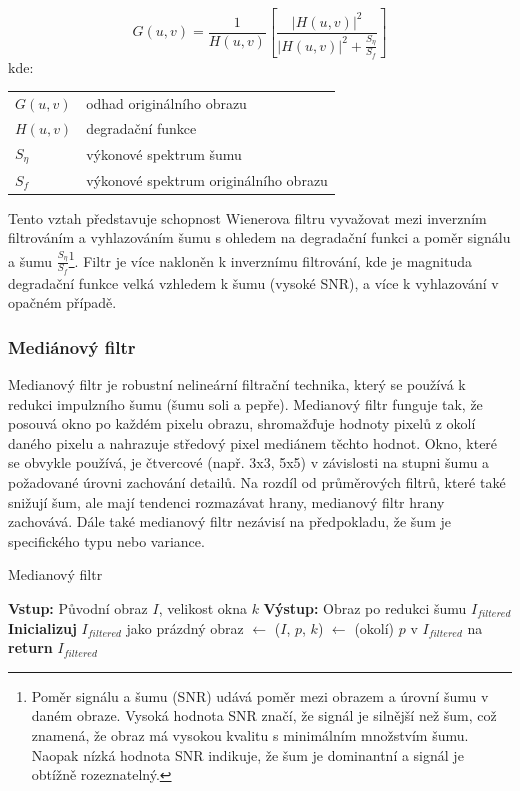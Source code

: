 \documentclass[male,czech,api_ing]{thesis}
\makeatletter
\newenvironment{conditions}[1][kde:]
    {#1 \begin{tabular}[t]{>{$}l<{$} @{${}={}$} >{\raggedright\arraybackslash}p{10cm}}}
    {\end{tabular}}
\makeatother
\begin{document}
\begin{equation}
    G(u,v) = \frac{1}{H(u,v)} \left[ \frac{\left| H(u,v) \right|^2}{\left| H(u,v) \right|^2 + \frac{S_{\eta}}{S_f}} \right]
\end{equation}
\begin{conditions}
    G(u,v) & odhad originálního obrazu \\
    H(u,v) & degradační funkce \\
    S_{\eta} & výkonové spektrum šumu \\
    S_f & výkonové spektrum originálního obrazu
\end{conditions}

Tento vztah představuje schopnost Wienerova filtru vyvažovat mezi inverzním filtrováním a vyhlazováním šumu s ohledem na degradační funkci a poměr signálu a šumu $\frac{S_{\eta}}{S_f}$\footnote{Poměr signálu a šumu (SNR) udává poměr mezi obrazem a úrovní šumu v daném obraze. Vysoká hodnota SNR značí, že signál je silnější než šum, což znamená, že obraz má vysokou kvalitu s minimálním množstvím šumu. Naopak nízká hodnota SNR indikuje, že šum je dominantní a signál je obtížně rozeznatelný.}. Filtr je více nakloněn k inverznímu filtrování, kde je magnituda degradační funkce velká vzhledem k šumu (vysoké SNR), a více k vyhlazování v opačném případě. \cite{WienerFilters}

\subsubsection{Mediánový filtr}
Medianový filtr je robustní nelineární filtrační technika, který se používá k redukci impulzního šumu (šumu soli a pepře). Medianový filtr funguje tak, že posouvá okno po každém pixelu obrazu, shromažďuje hodnoty pixelů z okolí daného pixelu a nahrazuje středový pixel mediánem těchto hodnot. Okno, které se obvykle používá, je čtvercové (např. 3x3, 5x5) v závislosti na stupni šumu a požadované úrovni zachování detailů. Na rozdíl od průměrových filtrů, které také snižují šum, ale mají tendenci rozmazávat hrany, medianový filtr hrany zachovává. Dále také medianový filtr nezávisí na předpokladu, že šum je specifického typu nebo variance.

\begin{algorithm}
    \caption{Medianový filtr}
    \begin{algorithmic}[1]
        \State \textbf{Vstup:} Původní obraz $I$, velikost okna $k$
        \State \textbf{Výstup:} Obraz po redukci šumu $I_{filtered}$
        \State \textbf{Inicializuj} $I_{filtered}$ jako prázdný obraz
            \State {} $\gets$ ($I$, $p$, $k$)
            \State {} $\gets$ (okolí)
            \State {} $p$ v $I_{filtered}$ na 
        \EndFor
        \State \textbf{return} $I_{filtered}$
    \end{algorithmic}
\end{algorithm}
\end{document}
